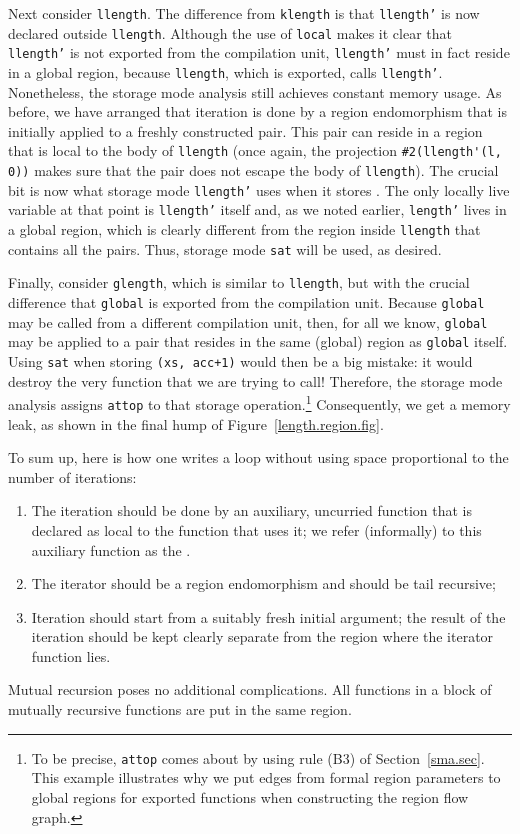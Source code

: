 \documentclass[12pt]{book}
\begin{document}
Next consider {\tt llength}. The difference from {\tt klength} is
that {\tt llength'} is now declared outside {\tt llength}.
Although the use of {\tt local} makes it clear that {\tt llength'}
is not exported from the compilation unit, {\tt llength'} must in fact reside
in a global region, because {\tt llength}, which is exported, calls
{\tt llength'}.  Nonetheless, the storage mode analysis still achieves
constant memory usage. As before, we have arranged that iteration is
done by a region endomorphism that is initially applied to a freshly
constructed pair. This pair can reside in a region that is local to the
body of {\tt llength} (once again, the projection \verb+#2(llength'(l, 0))+
makes sure that the pair does not escape the body of {\tt llength}).
The crucial bit is now what storage mode {\tt llength'} uses 
when it stores .
The only locally live
variable at that point is {\tt llength'} itself and, as we noted earlier,
{\tt length'} lives in a global region, which is clearly different
from the region inside {\tt llength} that contains all the pairs.
Thus, storage mode {\tt sat} will be used, as desired.

Finally, consider {\tt glength}, which is similar to {\tt llength},
but with the crucial difference that {\tt global} is exported from the
compilation unit. Because {\tt global} may be called from a different
compilation unit, then, for all we know, {\tt global} may be applied
to a pair that resides in the same (global) region as {\tt global}
itself. Using {\tt sat} when storing {\tt (xs, acc+1)} would then be a
big mistake: it would destroy the very function that we are trying to
call! Therefore, the storage mode analysis assigns {\tt attop} to that
storage operation.\footnote{To be precise, {\tt attop} comes about by
  using rule (B3) of Section~\ref{sma.sec}. This example illustrates
  why we put edges from formal region parameters to global regions for
  exported functions when constructing the region flow graph.}
Consequently, we get a memory leak, as shown in the final hump of
Figure~\ref{length.region.fig}.

To sum up, here is how one writes a loop without using space proportional
to the number of iterations:
\begin{enumerate}
\item The iteration should be done by an auxiliary, uncurried function
  that is declared as local to the function that uses it; we refer
  (informally) to this auxiliary function as the .
\item The iterator should be a region
  endomorphism and should be tail recursive;
\item Iteration should start from a suitably fresh initial argument;
  the result of the iteration should be kept clearly separate from the
  region where the iterator function lies.
\end{enumerate}
Mutual recursion poses no additional complications. All functions
in a block of mutually recursive functions are put in the same region.
\end{document}
